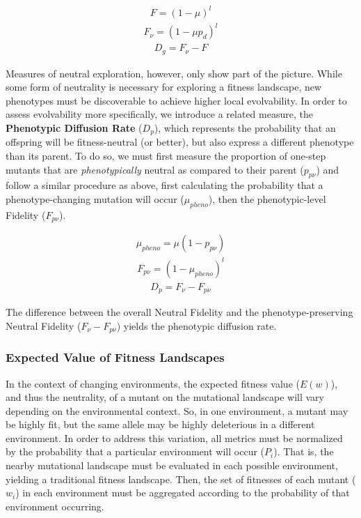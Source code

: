 \documentclass[10pt,letterpaper,final]{article}
\begin{document}
	\begin{eqnarray}
	\label{eq:fidelity}
		F = (1 - \mu)^l
	\end{eqnarray}
	\begin{eqnarray}
	\label{eq:neutral_fidelity}
		F_\nu = (1 - \mu p_d)^l
	\end{eqnarray}
	\begin{eqnarray}
	\label{eq:genomic_diffusion_rate}
		D_g = F_\nu - F
	\end{eqnarray}

Measures of neutral exploration, however, only show part of the picture. While some form of neutrality is necessary for exploring a fitness landscape, new phenotypes must be discoverable to achieve higher local evolvability. In order to assess evolvability more specifically, we introduce a related measure, the \textbf{Phenotypic Diffusion Rate} ($D_p$), which represents the probability that an offspring will be fitness-neutral (or better), but also express a different phenotype than its parent. To do so, we must first measure the proportion of one-step mutants that are \textit{phenotypically} neutral as compared to their parent ($p_{p\nu}$) and follow a similar procedure as above, first calculating the probability that a phenotype-changing mutation will occur ($\mu_{pheno}$), then the phenotypic-level Fidelity ($F_{p\nu}$).

	\begin{eqnarray}
	\label{eq:phenotypic_mutation_rate}
		\mu_{pheno} = \mu (1- p_{p\nu})
	\end{eqnarray}
	\begin{eqnarray}
	\label{eq:phenotypic_fidelity}
		F_{p\nu} = (1 - \mu_{pheno})^l
	\end{eqnarray}
	\begin{eqnarray}
	\label{eq:phenotypic_diffusion_rate}
		D_p = F_\nu - F_{p\nu}
	\end{eqnarray}

The difference between the overall Neutral Fidelity and the phenotype-preserving Neutral Fidelity ($F_\nu - F_{p\nu}$) yields the phenotypic diffusion rate.

\subsubsection*{Expected Value of Fitness Landscapes}
In the context of changing environments, the expected fitness value ($E(w)$), and thus the neutrality, of a mutant on the mutational landscape will vary depending on the environmental context. So, in one environment, a mutant may be highly fit, but the same allele may be highly deleterious in a different environment. In order to address this variation, all metrics must be normalized by the probability that a particular environment will occur ($P_i$). That is, the nearby mutational landscape must be evaluated in each possible environment, yielding a traditional fitness landscape. Then, the set of fitnesses of each mutant ($w_i$) in each environment must be aggregated according to the probability of that environment occurring.
\end{document}
